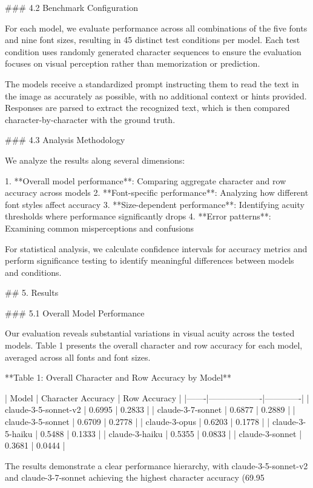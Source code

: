 \documentclass{article}
\begin{document}
### 4.2 Benchmark Configuration

For each model, we evaluate performance across all combinations of the five fonts and nine font sizes, resulting in 45 distinct test conditions per model. Each test condition uses randomly generated character sequences to ensure the evaluation focuses on visual perception rather than memorization or prediction.

The models receive a standardized prompt instructing them to read the text in the image as accurately as possible, with no additional context or hints provided. Responses are parsed to extract the recognized text, which is then compared character-by-character with the ground truth.

### 4.3 Analysis Methodology

We analyze the results along several dimensions:

1. **Overall model performance**: Comparing aggregate character and row accuracy across models
2. **Font-specific performance**: Analyzing how different font styles affect accuracy
3. **Size-dependent performance**: Identifying acuity thresholds where performance significantly drops
4. **Error patterns**: Examining common misperceptions and confusions

For statistical analysis, we calculate confidence intervals for accuracy metrics and perform significance testing to identify meaningful differences between models and conditions.

## 5. Results

### 5.1 Overall Model Performance

Our evaluation reveals substantial variations in visual acuity across the tested models. Table 1 presents the overall character and row accuracy for each model, averaged across all fonts and font sizes.

**Table 1: Overall Character and Row Accuracy by Model**

| Model | Character Accuracy | Row Accuracy |
|-------|-------------------|-------------|
| claude-3-5-sonnet-v2 | 0.6995 | 0.2833 |
| claude-3-7-sonnet | 0.6877 | 0.2889 |
| claude-3-5-sonnet | 0.6709 | 0.2778 |
| claude-3-opus | 0.6203 | 0.1778 |
| claude-3-5-haiku | 0.5488 | 0.1333 |
| claude-3-haiku | 0.5355 | 0.0833 |
| claude-3-sonnet | 0.3681 | 0.0444 |

The results demonstrate a clear performance hierarchy, with claude-3-5-sonnet-v2 and claude-3-7-sonnet achieving the highest character accuracy (69.95%
\end{document}
